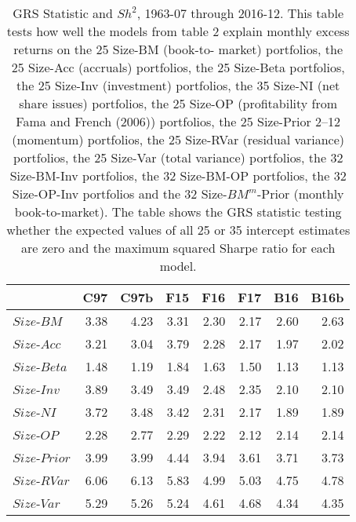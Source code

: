 
\begin{table}[!ht]
\centering
\caption{
\scriptsize{
GRS Statistic and $Sh^2$, 1963-07 through 2016-12. This table tests how well the models
from table 2 explain monthly excess returns on the 25 Size-BM (book-to- market)
portfolios, the 25 Size-Acc (accruals) portfolios, the 25 Size-Beta portfolios, the 25
Size-Inv (investment) portfolios, the 35 Size-NI (net share issues) portfolios, the 25
Size-OP (profitability from Fama and French (2006)) portfolios, the 25 Size-Prior 2–12
(momentum) portfolios, the 25 Size-RVar (residual variance) portfolios, the 25 Size-Var
(total variance) portfolios, the 32 Size-BM-Inv portfolios, the 32 Size-BM-OP portfolios,
the 32 Size-OP-Inv portfolios and the 32 Size-$BM^m$-Prior (monthly book-to-market). The
table shows the GRS statistic testing whether the expected values of all 25 or 35
intercept estimates are zero and the maximum squared Sharpe ratio for each model.
}
}
\begin{tabular}{lrrrrrrr}
  \toprule
     & C97  & C97b  & F15  & F16  & F17  & B16  & B16b  \\
  \midrule
  
    $Size$-$BM$  & 3.38  & 4.23  & 3.31  & 2.30  & 2.17  & 2.60  & 2.63  \\
  
    $Size$-$Acc$  & 3.21  & 3.04  & 3.79  & 2.28  & 2.17  & 1.97  & 2.02  \\
  
    $Size$-$Beta$  & 1.48  & 1.19  & 1.84  & 1.63  & 1.50  & 1.13  & 1.13  \\
  
    $Size$-$Inv$  & 3.89  & 3.49  & 3.49  & 2.48  & 2.35  & 2.10  & 2.10  \\
  
    $Size$-$NI$  & 3.72  & 3.48  & 3.42  & 2.31  & 2.17  & 1.89  & 1.89  \\
  
    $Size$-$OP$  & 2.28  & 2.77  & 2.29  & 2.22  & 2.12  & 2.14  & 2.14  \\
  
    $Size$-$Prior$  & 3.99  & 3.99  & 4.44  & 3.94  & 3.61  & 3.71  & 3.73  \\
  
    $Size$-$RVar$  & 6.06  & 6.13  & 5.83  & 4.99  & 5.03  & 4.75  & 4.78  \\
  
    $Size$-$Var$  & 5.29  & 5.26  & 5.24  & 4.61  & 4.68  & 4.34  & 4.35  \\
  

\end{tabular}
\end{table}
